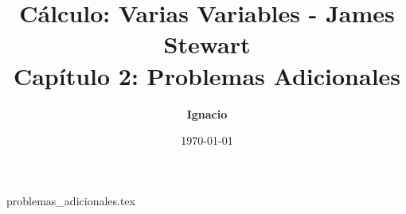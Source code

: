 \documentclass[11pt,spanish,oneside]{report}
\title{\textbf{Cálculo: Varias Variables - James Stewart} \\ \Large Capítulo 2: Problemas Adicionales}
\author{\textbf{Ignacio}}
\date{\today}
\begin{document}
\maketitle

{problemas_adicionales.tex}
\end{document}
